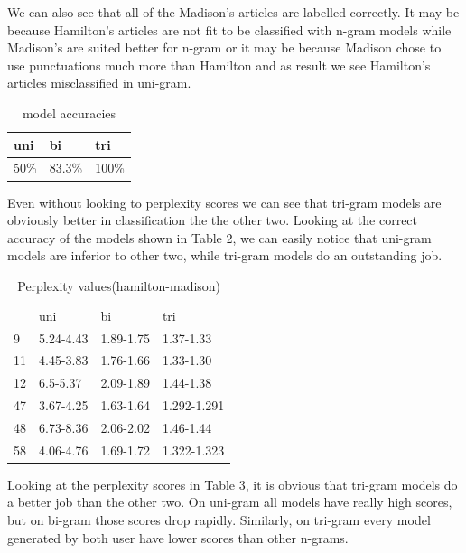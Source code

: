 \documentclass{article}
\begin{document}
We can also see that all of the Madison's articles are labelled correctly. It may be because Hamilton's articles are not fit to be classified with n-gram models while Madison's are suited better for n-gram or it may be because Madison chose to use punctuations much more than Hamilton and as result we see Hamilton's articles misclassified in uni-gram.

\begin{table}[H]
\centering
\begin{tabular}{|l|l|l|}
\hline
uni  & bi     & tri   \\ \hline
50\% & 83.3\% & 100\% \\ \hline
\end{tabular}
\caption{model accuracies}
\end{table}

Even without looking to perplexity scores we can see that tri-gram models are obviously better in classification the the other two. Looking at the correct accuracy of the models shown in Table 2, we can easily notice that uni-gram models are inferior to other two, while tri-gram models do an outstanding job.

\begin{table}[H]
\centering
\begin{tabular}{llll}
   & uni       & bi        & tri         \\
9  & 5.24-4.43 & 1.89-1.75 & 1.37-1.33   \\
11 & 4.45-3.83 & 1.76-1.66 & 1.33-1.30   \\
12 & 6.5-5.37  & 2.09-1.89 & 1.44-1.38   \\
47 & 3.67-4.25 & 1.63-1.64 & 1.292-1.291 \\
48 & 6.73-8.36 & 2.06-2.02 & 1.46-1.44   \\
58 & 4.06-4.76 & 1.69-1.72 & 1.322-1.323
\end{tabular}
\caption{Perplexity values(hamilton-madison)}
\end{table}

Looking at the perplexity scores in Table 3, it is obvious that tri-gram models do a better job than the other two. On uni-gram all models have really high scores, but on bi-gram those scores drop rapidly. Similarly, on tri-gram every model generated by both user have lower scores than other n-grams.


\end{document}

